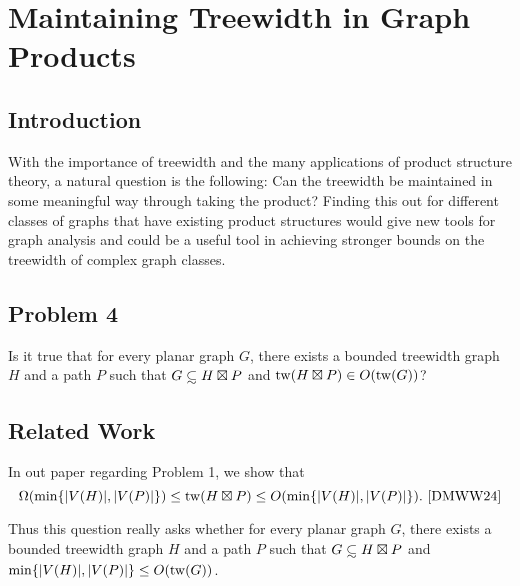 \documentclass[../main.tex]{subfiles}
\begin{document}
	
	\section{Maintaining Treewidth in Graph Products}
	\subsection{Introduction}
	With the importance of treewidth and the many applications of product structure theory, a natural question is the following: Can the treewidth be maintained in some meaningful way through taking the product? Finding this out for different classes of graphs that have existing product structures would give new tools for graph analysis and could be a useful tool in achieving stronger bounds on the treewidth of complex graph classes. 
	\subsection{Problem 4}
	  Is it true that for every planar graph $G$, there exists a bounded treewidth graph $H$ and a path $P$ such that $G \subsetsim H\boxtimes P$ and $\operatorname{tw}(H\boxtimes P) \in O(\operatorname{tw}(G))$? 
	
	\subsection{Related Work}
	In out paper regarding Problem 1, we show that $$\Omega(\min\{|V(H)|,|V(P)|\})\leq  \tw( H\boxtimes P) \leq O(\min\{|V(H)|,|V(P)|\}).~\text{\cite[Lemma~3, Equation~(2)]{DMWW24}}$$ 
	
	Thus this question really asks whether for every planar graph $G$, there exists a bounded treewidth graph $H$ and a path $P$ such that $G\subsetsim H\boxtimes P$ and $\min\{|V(H)|,|V(P)|\} \leq O(\operatorname{tw}(G))$. 
	
	
	
\end{document}
